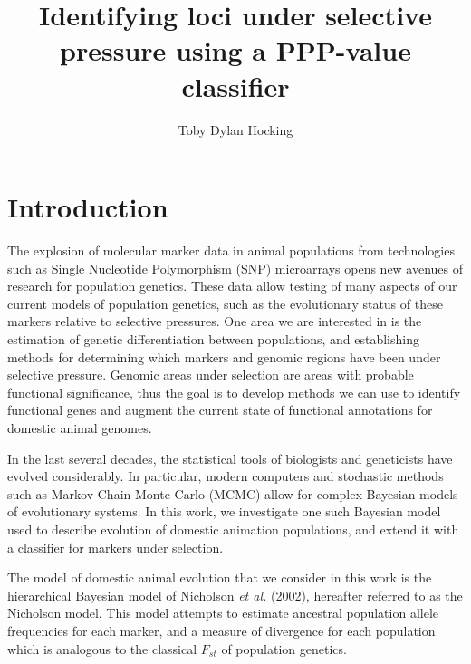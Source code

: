 \documentclass[a4paper,12pt]{article}
\title{Identifying loci under selective pressure using a PPP-value classifier}
\author{Toby Dylan Hocking}
\begin{document}
\maketitle

\newcommand{\fig}[3][1]{
  \begin{figure}[htp]
    \begin{center}
    \texttt{[image: \#2]}
    \end{center}
    \caption{#3\label{#2}}
  \end{figure}
}
\newcommand{\brat}[2]{
  \left[
    \begin{array}{#1}
      #2
    \end{array}
    \right]
}
\newcommand{\neff}{\text{popsize}}
\newcommand{\aij}{\alpha_{ij}(t)}
\newcommand{\aijs}{\alpha_{ij}^*(t)}
\newcommand{\wij}[1]{w_{ij}^{\text{#1}}}
\newcommand{\etal}{\emph{et al.}}
\newcommand{\RR}{\mathbb R}
\newcommand{\Bin}{\operatorname{Binomial}}

\section{Introduction}

The explosion of molecular marker data in animal populations from
technologies such as Single Nucleotide Polymorphism (SNP) microarrays
opens new avenues of research for population genetics. These data
allow testing of many aspects of our current models of population
genetics, such as the evolutionary status of these markers relative to
selective pressures. One area we are interested in is the estimation
of genetic differentiation between populations, and establishing
methods for determining which markers and genomic regions have been
under selective pressure. Genomic areas under selection are areas with
probable functional significance, thus the goal is to develop methods
we can use to identify functional genes and augment the current state
of functional annotations for domestic animal genomes.

In the last several decades, the statistical tools of biologists and
geneticists have evolved considerably. In particular, modern computers
and stochastic methods such as Markov Chain Monte Carlo (MCMC) allow
for complex Bayesian models of evolutionary systems. In this work, we
investigate one such Bayesian model used to describe evolution of
domestic animation populations, and extend it with a classifier for
markers under selection.

The model of domestic animal evolution that we consider in this work
is the hierarchical Bayesian model of Nicholson \etal
(2002)\cite{nicholson}, hereafter referred to as the Nicholson
model. This model attempts to estimate ancestral population allele
frequencies for each marker, and a measure of divergence for each
population which is analogous to the classical $F_{st}$ of population
genetics.
\end{document}
